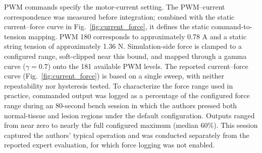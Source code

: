 \documentclass{ieeeaccess}
\begin{document}
PWM commands specify the motor-current setting. The PWM--current correspondence was measured before integration; combined with the static current--force curve in Fig.~\ref{fig:current_force}, it defines the static command-to-tension mapping. PWM 180 corresponds to approximately 0.78 A and a static string tension of approximately 1.36 N. Simulation-side force is clamped to a configured range, soft-clipped near this bound, and mapped through a gamma curve ($\gamma=0.7$) onto the 181 available PWM levels. The reported current--force curve (Fig.~\ref{fig:current_force}) is based on a single sweep, with neither repeatability nor hysteresis tested. To characterize the force range used in practice, commanded output was logged as a percentage of the configured force range during an 80-second bench session in which the authors pressed both normal-tissue and lesion regions under the default configuration. Outputs ranged from near zero to nearly the full configured maximum (median 60\%). This session captured the authors' typical operation and was conducted separately from the reported expert evaluation, for which force logging was not enabled.
\end{document}
